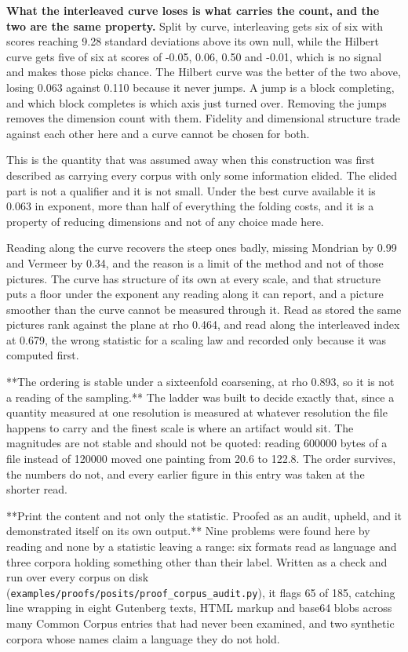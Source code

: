 \textbf{What the interleaved curve loses is what carries the count, and the two are the same property.} Split by curve, interleaving gets six of six with scores reaching 9.28 standard deviations above its own null, while the Hilbert curve gets five of six at scores of -0.05, 0.06, 0.50 and -0.01, which is no signal and makes those picks chance. The Hilbert curve was the better of the two above, losing 0.063 against 0.110 because it never jumps. A jump is a block completing, and which block completes is which axis just turned over. Removing the jumps removes the dimension count with them. Fidelity and dimensional structure trade against each other here and a curve cannot be chosen for both.

This is the quantity that was assumed away when this construction was first described as carrying every corpus with only some information elided. The elided part is not a qualifier and it is not small. Under the best curve available it is 0.063 in exponent, more than half of everything the folding costs, and it is a property of reducing dimensions and not of any choice made here.

Reading along the curve recovers the steep ones badly, missing Mondrian by 0.99 and Vermeer by 0.34, and the reason is a limit of the method and not of those pictures. The curve has structure of its own at every scale, and that structure puts a floor under the exponent any reading along it can report, and a picture smoother than the curve cannot be measured through it. Read as stored the same pictures rank against the plane at rho 0.464, and read along the interleaved index at 0.679, the wrong statistic for a scaling law and recorded only because it was computed first.

**The ordering is stable under a sixteenfold coarsening, at rho 0.893, so it is not a reading of the sampling.** The ladder was built to decide exactly that, since a quantity measured at one resolution is measured at whatever resolution the file happens to carry and the finest scale is where an artifact would sit. The magnitudes are not stable and should not be quoted: reading 600000 bytes of a file instead of 120000 moved one painting from 20.6 to 122.8. The order survives, the numbers do not, and every earlier figure in this entry was taken at the shorter read.

**Print the content and not only the statistic. Proofed as an audit, upheld, and it demonstrated itself on its own output.** Nine problems were found here by reading and none by a statistic leaving a range: six formats read as language and three corpora holding something other than their label. Written as a check and run over every corpus on disk (\texttt{examples/\allowbreak{}proofs/\allowbreak{}posits/\allowbreak{}proof\_\allowbreak{}corpus\_\allowbreak{}audit.\allowbreak{}py}), it flags 65 of 185, catching line wrapping in eight Gutenberg texts, HTML markup and base64 blobs across many Common Corpus entries that had never been examined, and two synthetic corpora whose names claim a language they do not hold.

